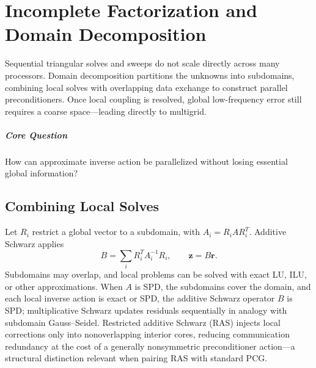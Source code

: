 \chapter{Incomplete Factorization and Domain Decomposition}\label{v0ch:18}
\begin{chaptersummary}
Sequential triangular solves and sweeps do not scale directly across many processors. Domain decomposition partitions the unknowns into subdomains, combining local solves with overlapping data exchange to construct parallel preconditioners. Once local coupling is resolved, global low-frequency error still requires a coarse space—leading directly to multigrid.
\end{chaptersummary}
\paragraph{Core Question}How can approximate inverse action be parallelized without losing essential global information?

\section{Combining Local Solves}
Let $R_i$ restrict a global vector to a subdomain, with $A_i=R_iAR_i^T$. Additive Schwarz applies
\[
 B=\sum_i R_i^TA_i^{-1}R_i,\qquad \bm z=B\bm r.
\]
Subdomains may overlap, and local problems can be solved with exact LU, ILU, or other approximations. When $A$ is SPD, the subdomains cover the domain, and each local inverse action is exact or SPD, the additive Schwarz operator $B$ is SPD; multiplicative Schwarz updates residuals sequentially in analogy with subdomain Gauss--Seidel.
Restricted additive Schwarz (RAS) injects local corrections only into nonoverlapping interior cores, reducing communication redundancy at the cost of a generally nonsymmetric preconditioner action—a structural distinction relevant when pairing RAS with standard PCG.
